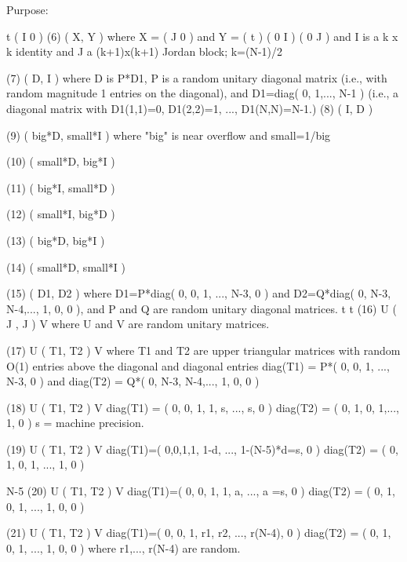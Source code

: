 \begin{DoxyParagraph}{Purpose\+: }
\begin{DoxyVerb}
                                     t                ( I   0  )
 (6)  ( X, Y )         where  X = ( J   0  )  and Y = (      t )
                                  ( 0   I  )          ( 0   J  )
                       and I is a k x k identity and J a (k+1)x(k+1)
                       Jordan block; k=(N-1)/2

 (7)  ( D, I )         where D is P*D1, P is a random unitary diagonal
                       matrix (i.e., with random magnitude 1 entries
                       on the diagonal), and D1=diag( 0, 1,..., N-1 )
                       (i.e., a diagonal matrix with D1(1,1)=0,
                       D1(2,2)=1, ..., D1(N,N)=N-1.)
 (8)  ( I, D )

 (9)  ( big*D, small*I ) where "big" is near overflow and small=1/big

 (10) ( small*D, big*I )

 (11) ( big*I, small*D )

 (12) ( small*I, big*D )

 (13) ( big*D, big*I )

 (14) ( small*D, small*I )

 (15) ( D1, D2 )        where D1=P*diag( 0, 0, 1, ..., N-3, 0 ) and
                        D2=Q*diag( 0, N-3, N-4,..., 1, 0, 0 ), and
                        P and Q are random unitary diagonal matrices.
           t   t
 (16) U ( J , J ) V     where U and V are random unitary matrices.

 (17) U ( T1, T2 ) V    where T1 and T2 are upper triangular matrices
                        with random O(1) entries above the diagonal
                        and diagonal entries diag(T1) =
                        P*( 0, 0, 1, ..., N-3, 0 ) and diag(T2) =
                        Q*( 0, N-3, N-4,..., 1, 0, 0 )

 (18) U ( T1, T2 ) V    diag(T1) = ( 0, 0, 1, 1, s, ..., s, 0 )
                        diag(T2) = ( 0, 1, 0, 1,..., 1, 0 )
                        s = machine precision.

 (19) U ( T1, T2 ) V    diag(T1)=( 0,0,1,1, 1-d, ..., 1-(N-5)*d=s, 0 )
                        diag(T2) = ( 0, 1, 0, 1, ..., 1, 0 )

                                                        N-5
 (20) U ( T1, T2 ) V    diag(T1)=( 0, 0, 1, 1, a, ..., a   =s, 0 )
                        diag(T2) = ( 0, 1, 0, 1, ..., 1, 0, 0 )

 (21) U ( T1, T2 ) V    diag(T1)=( 0, 0, 1, r1, r2, ..., r(N-4), 0 )
                        diag(T2) = ( 0, 1, 0, 1, ..., 1, 0, 0 )
                        where r1,..., r(N-4) are random.


\end{DoxyVerb}
\end{DoxyParagraph}
